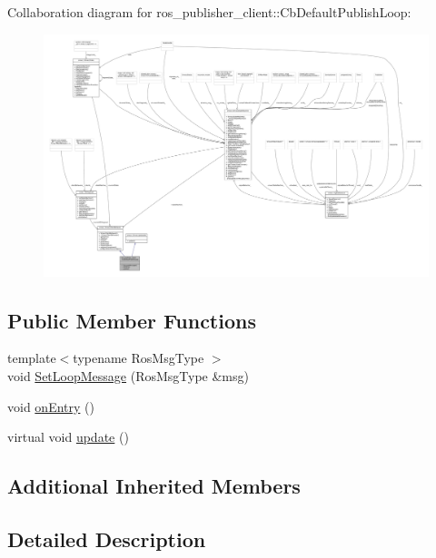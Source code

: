 Collaboration diagram for ros\+\_\+publisher\+\_\+client\+:\+:Cb\+Default\+Publish\+Loop\+:
\nopagebreak
\begin{figure}[H]
\begin{center}
\leavevmode
\includegraphics[width=350pt]{classros__publisher__client_1_1CbDefaultPublishLoop__coll__graph}
\end{center}
\end{figure}
\subsection*{Public Member Functions}
\begin{DoxyCompactItemize}
\item 
{\footnotesize template$<$typename Ros\+Msg\+Type $>$ }\\void \hyperlink{classros__publisher__client_1_1CbDefaultPublishLoop_a281a7385dfb191207657c9c90f999a23}{Set\+Loop\+Message} (Ros\+Msg\+Type \&msg)
\item 
void \hyperlink{classros__publisher__client_1_1CbDefaultPublishLoop_ae4d12184e4d5fb8cab0eb34e60757739}{on\+Entry} ()
\item 
virtual void \hyperlink{classros__publisher__client_1_1CbDefaultPublishLoop_aac7546e32e37fd833eac47d3976463b3}{update} ()
\end{DoxyCompactItemize}
\subsection*{Additional Inherited Members}


\subsection{Detailed Description}


